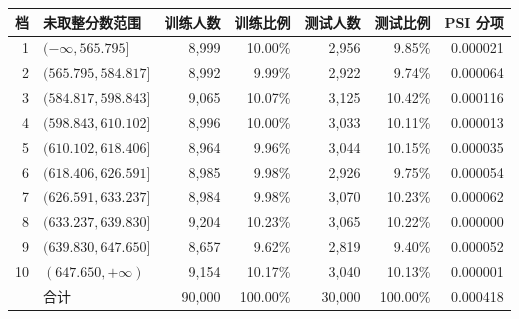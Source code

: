 \begin{tabular}{rlrrrrr}
\toprule
档 & 未取整分数范围 & 训练人数 & 训练比例 & 测试人数 & 测试比例 & PSI 分项 \\
\midrule
1 & $(-\infty, 565.795]$ & 8,999 & 10.00\% & 2,956 & 9.85\% & 0.000021 \\
2 & $(565.795, 584.817]$ & 8,992 & 9.99\% & 2,922 & 9.74\% & 0.000064 \\
3 & $(584.817, 598.843]$ & 9,065 & 10.07\% & 3,125 & 10.42\% & 0.000116 \\
4 & $(598.843, 610.102]$ & 8,996 & 10.00\% & 3,033 & 10.11\% & 0.000013 \\
5 & $(610.102, 618.406]$ & 8,964 & 9.96\% & 3,044 & 10.15\% & 0.000035 \\
6 & $(618.406, 626.591]$ & 8,985 & 9.98\% & 2,926 & 9.75\% & 0.000054 \\
7 & $(626.591, 633.237]$ & 8,984 & 9.98\% & 3,070 & 10.23\% & 0.000062 \\
8 & $(633.237, 639.830]$ & 9,204 & 10.23\% & 3,065 & 10.22\% & 0.000000 \\
9 & $(639.830, 647.650]$ & 8,657 & 9.62\% & 2,819 & 9.40\% & 0.000052 \\
10 & $(647.650, +\infty)$ & 9,154 & 10.17\% & 3,040 & 10.13\% & 0.000001 \\
\midrule
 & 合计 & 90,000 & 100.00\% & 30,000 & 100.00\% & 0.000418 \\
\bottomrule
\end{tabular}
